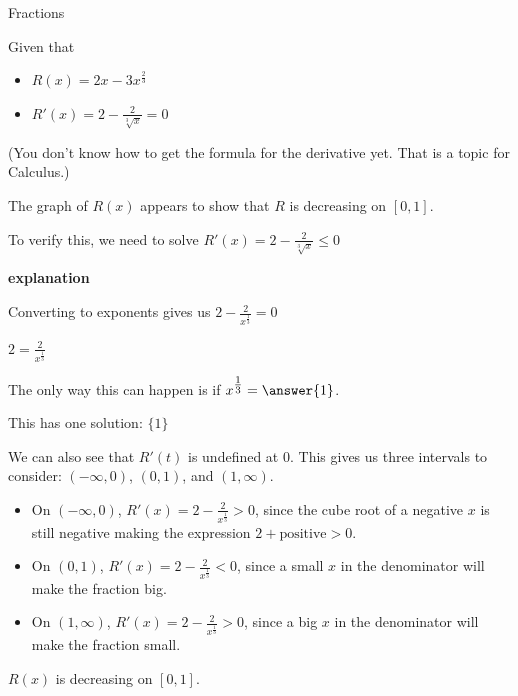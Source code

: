\documentclass{ximera}
\begin{document}
\begin{example}  Fractions


Given that

\begin{itemize}
\item $R(x) = 2x - 3 x^{\tfrac{2}{3}}$
\item $R'(x) = 2 - \frac{2}{\sqrt[3]{x}} = 0$
\end{itemize}
(You don't know how to get the formula for the derivative yet.  That is a topic for Calculus.)

The graph of $R(x)$ appears to show that $R$ is decreasing on $[0, 1]$.
\begin{center}
\end{center}










To verify this, we need to solve $R'(x) = 2 - \frac{2}{\sqrt[3]{x}}  \leq 0$



\textbf{\textcolor{red!75!green}{explanation}} 


Converting to exponents gives us $2 - \frac{2}{x^{\tfrac{1}{3}}} = 0$


$2 = \frac{2}{x^{\tfrac{1}{3}}}$

The only way this can happen is if $x^{\tfrac{1}{3}} = \answer{1}$.

This has one solution: $\{  1  \}$



We can also see that $R'(t)$ is undefined at $0$.  This gives us three intervals to consider: $(-\infty, 0)$, $(0, 1)$, and $(1, \infty)$.



\begin{itemize}
\item On $(-\infty, 0)$, $R'(x) = 2 - \frac{2}{x^{\tfrac{1}{3}}} > 0$, since the cube root of a negative $x$ is still negative making the expression $2 + \text{positive} > 0$.
\item On $(0,1)$, $R'(x) = 2 - \frac{2}{x^{\tfrac{1}{3}}} < 0$, since a small $x$ in the denominator will make the fraction big.
\item On $(1,\infty)$, $R'(x) = 2 - \frac{2}{x^{\tfrac{1}{3}}} > 0$, since a big $x$ in the denominator will make the fraction small.
\end{itemize}


$R(x)$ is decreasing on $[0,1]$.




\end{example}
\end{document}
